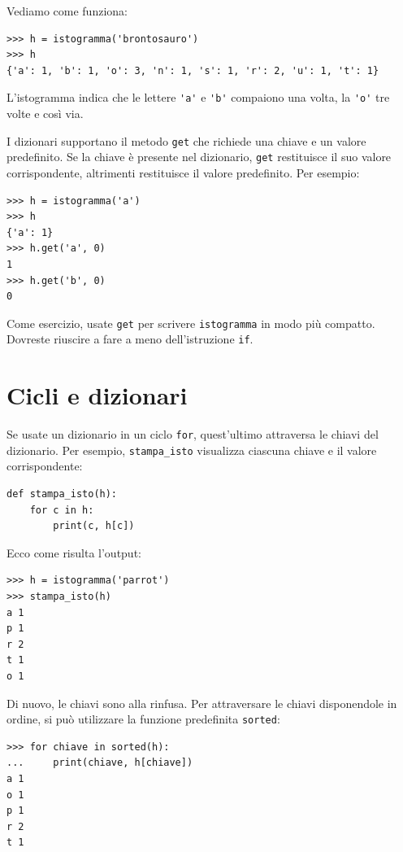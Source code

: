 \documentclass[10pt]{book}
\begin{document}
Vediamo come funziona:

\begin{verbatim}
>>> h = istogramma('brontosauro')
>>> h
{'a': 1, 'b': 1, 'o': 3, 'n': 1, 's': 1, 'r': 2, 'u': 1, 't': 1}
\end{verbatim}
%
L'istogramma indica che le lettere \verb"'a'" e \verb"'b'"
compaiono una volta, la \verb"'o'" tre volte e così via.

I dizionari supportano il metodo {\tt get} che richiede una chiave e un valore predefinito. Se la chiave è presente nel dizionario, {\tt get} restituisce il suo valore corrispondente, altrimenti restituisce il valore predefinito. Per esempio:

\begin{verbatim}
>>> h = istogramma('a')
>>> h
{'a': 1}
>>> h.get('a', 0)
1
>>> h.get('b', 0)
0
\end{verbatim}
%
Come esercizio, usate {\tt get} per scrivere {\tt istogramma} in modo più compatto. Dovreste riuscire a fare a meno dell'istruzione {\tt if}.


\section{Cicli e dizionari}

Se usate un dizionario in un ciclo {\tt for}, quest'ultimo attraversa le chiavi del dizionario. Per esempio, \verb"stampa_isto" visualizza ciascuna chiave e il valore corrispondente:

\begin{verbatim}
def stampa_isto(h):
    for c in h:
        print(c, h[c])
\end{verbatim}
%
Ecco come risulta l'output:

\begin{verbatim}
>>> h = istogramma('parrot')
>>> stampa_isto(h)
a 1
p 1
r 2
t 1
o 1
\end{verbatim}
%
Di nuovo, le chiavi sono alla rinfusa. Per attraversare le chiavi disponendole
in ordine, si può utilizzare la funzione predefinita {\tt sorted}:

\begin{verbatim}
>>> for chiave in sorted(h):
...     print(chiave, h[chiave])
a 1
o 1
p 1
r 2
t 1
\end{verbatim}
\end{document}
